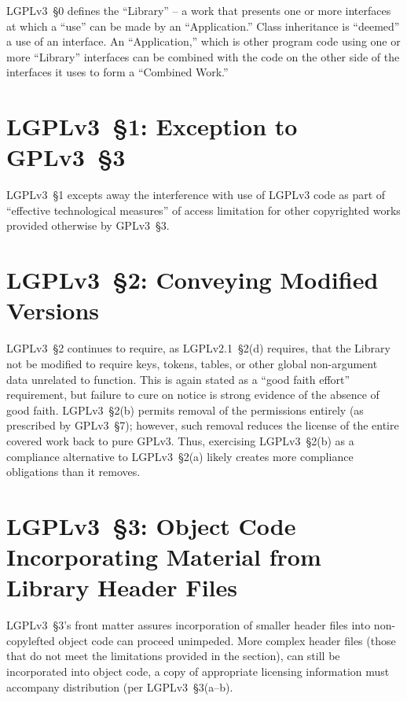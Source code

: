 LGPLv3~\S0 defines the ``Library'' -- a work that presents one or more
interfaces at which a ``use'' can be made by an ``Application.''  Class
inheritance is ``deemed'' a use of an interface.  An ``Application,'' which is
other program code using one or more ``Library'' interfaces can be combined
with the code on the other side of the interfaces it uses to form a
``Combined Work.''

\section{LGPLv3~\S1: Exception to GPLv3~\S3}

LGPLv3~\S1 excepts away the interference with use of LGPLv3 code as part of
``effective technological measures'' of access limitation for other copyrighted
works provided otherwise by GPLv3~\S3.

\section{LGPLv3~\S2: Conveying Modified Versions}

LGPLv3~\S2 continues to require, as LGPLv2.1~\S2(d) requires, that the Library
not be modified to require keys, tokens, tables, or other global non-argument
data unrelated to function. This is again stated as a ``good faith effort''
requirement, but failure to cure on notice is strong evidence of the absence
of good faith.  LGPLv3~\S2(b) permits removal of the permissions entirely (as
prescribed by GPLv3~\S7); however, such removal reduces the license of the
entire covered work back to pure GPLv3.   Thus, exercising LGPLv3~\S2(b) as a
compliance alternative to LGPLv3~\S2(a) likely creates more compliance
obligations than it removes.

\section{LGPLv3~\S3: Object Code Incorporating Material from Library Header Files}

LGPLv3~\S3's front matter assures incorporation of smaller header files into
non-copylefted object code can proceed unimpeded.  More complex
header files (those that do not meet the limitations provided in the
section), can still be incorporated into object code, a copy of appropriate
licensing information must accompany distribution (per LGPLv3~\S3(a--b).


